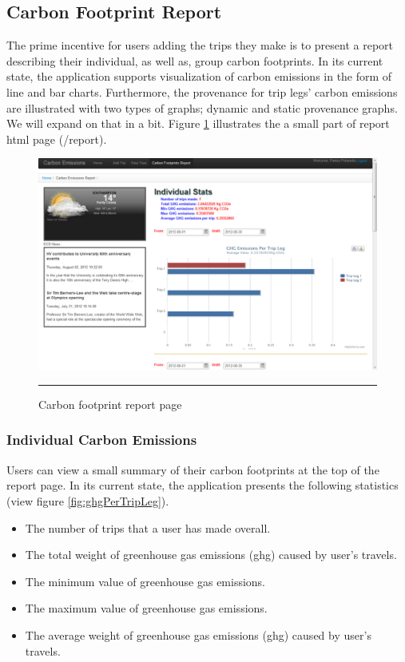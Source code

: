 \subsection{Carbon Footprint Report}

The prime incentive for users adding the trips they make is to present a report describing their individual, as well as, group carbon footprints. In its current state, the application supports visualization of carbon emissions in the form of line and bar charts. Furthermore, the provenance for trip legs' carbon emissions are illustrated with two types of graphs; dynamic and static provenance graphs. We will expand on that in a bit. Figure \ref{fig:reportOverview} illustrates the a small part of report html page (/report).

\begin{figure}[htbp]
	\centering
		\includegraphics[scale=0.40]{./Figures/chapter4/figure16.pdf}
		\rule{35em}{0.5pt}
	\caption[Carbon footprint report page]{Carbon footprint report page}
	\label{fig:reportOverview}
\end{figure}


\subsubsection{Individual Carbon Emissions}

Users can view a small summary of their carbon footprints at the top of the report page. In its current state, the application presents the following statistics (view figure \ref{fig:ghgPerTripLeg}).

\begin{itemize}
  \item The number of trips that a user has made overall.
  \item The total weight of greenhouse gas emissions (ghg) caused by user's travels.
  \item The minimum value of greenhouse gas emissions.
  \item The maximum value of greenhouse gas emissions.
  \item The average weight of greenhouse gas emissions (ghg) caused by user's travels.
\end{itemize}

